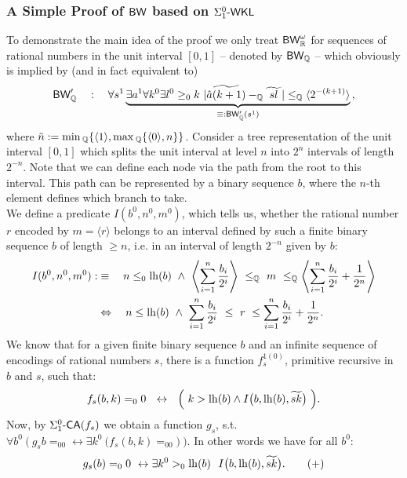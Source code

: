 \subsubsection*{A Simple Proof of $\textsf{\upshape BW}$ based on $\Sigma^0_1\textsf{\upshape -}\textsf{\upshape WKL}$} \label{ss:spuWKL}
To demonstrate the main idea of the proof we only treat $\textsf{\upshape BW}^\omega_{\mathbb{R}}$ for 
sequences of rational numbers in the unit interval $[0,1]$ -- denoted by 
$\textsf{\upshape BW}_{\mathbb{Q}}$ -- which obviously is implied by (and in fact equivalent to) 
\[
 {\BW_\QQ'}\quad:\quad
  \forall s^1  
   \underbrace{\exists a^1\forall k^0\exists l^0\geq_0 k
     \ |\widetilde{\hat a(k+1)}-_\QQ \widetilde {\ sl\ }|\leq_\QQ\langle2^{-(k+1)}
\rangle }_{ \equiv:\BW_\QQ'(s^1)}
\text{,}
\]
where $\tilde n := \min{}_{\mathbb{Q}}\{\langle 1\rangle,\max{}_{\mathbb{Q}}\{\langle 0\rangle,n\}\}$.
 Consider a tree representation of the unit interval $[0,1]$ which 
splits the unit interval at level $n$ into $2^n$ intervals of 
length $2^{-n}$.
Note that we can define each node via the path from the 
root to this interval. This path can be represented 
by a binary sequence $b$, where the $n$-th element defines which branch 
to take.\\
We define a predicate $I(b^0,n^0,m^0)$, which tells us, whether the 
rational number $r$ encoded by $m=\langle r \rangle$ belongs to an 
interval defined by such a finite binary sequence $b$
of length $\geq n$, i.e. in an interval of length $2^{-n}$ given by $b$: 
\begin{align*}
I(b^0,n^0,m^0)  :&\equiv\ \ \  
  \InIntM{b}{n}\\
&\Leftrightarrow\ \ \ n\leq \lh(b) \ \wedge\  
             \sum_{i=1}^{n}\frac{b_i}{2^i}\ \leq\ 
             r\ \leq\sum_{i=1}^{n}\frac{b_i}{2^i}+\frac{1}{2^n} 
\text{.}
\end{align*}
We know that for a given finite binary sequence $b$ and 
an infinite sequence of encodings of rational
numbers $s$, there is a function $f_{s}^{1(0)}$, primitive recursive in $b$ 
and $s$, such that:
\[
 f_{s}(b,k)=_00\ \ \leftrightarrow\ \ \Big(\ k > \lh(b)\wedge 
I\big(b,\lh(b),\widetilde{ sk }\big)\ \Big)
\text{.}\]
%
Now, by $\Sigma^0_1\textsf{\upshape -}\textsf{\upshape CA}(f_s)$ we obtain a function $g_s$, s.t. 
$
  \forall b^0\ \Big(\ g_sb=_00 \leftrightarrow \exists k^0\ 
\big(f_{s}(b,k)=_00\big)\ \Big)
\text{.}$
%
In other words we have for all $b^0$:
\[
  g_{s}(b)=_00\ \leftrightarrow \exists k^0>_0 \operatorname{lh}(b)\ \  
I\big(b,\operatorname{lh}(b),\widetilde{ sk }\big)
\text{.}
\tag{+}
\]

